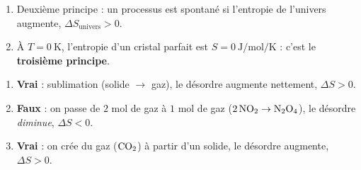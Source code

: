 \documentclass[11pt,a4paper]{article}
\newcommand{\dS}{\Delta S}
\newcommand{\rep}[1]{\textcolor{primarydark}{\textbf{#1}}}
\begin{document}
\begin{correction}
\begin{enumerate}[label=\alph*),leftmargin=2em,topsep=2pt,itemsep=2pt]
  \item Deuxième principe : un processus est spontané si l'entropie de l'univers augmente,
        \rep{$\dS_{\text{univers}}>0$}.
  \item À $T=\SI{0}{\kelvin}$, l'entropie d'un cristal parfait est \rep{$S=\SI{0}{\joule\per\mol\per\kelvin}$} :
        c'est le \rep{troisième principe}.
\end{enumerate}
\end{correction}

\begin{correction}
\begin{enumerate}[label=\alph*),leftmargin=2em,topsep=2pt,itemsep=2pt]
  \item \rep{Vrai} : sublimation (solide $\to$ gaz), le désordre augmente nettement, $\dS>0$.
  \item \rep{Faux} : on passe de $2$ mol de gaz à $1$ mol de gaz ($2\,\ce{NO2}\to\ce{N2O4}$), le désordre
        \emph{diminue}, $\dS<0$.
  \item \rep{Vrai} : on crée du gaz ($\ce{CO2}$) à partir d'un solide, le désordre augmente, $\dS>0$.
\end{enumerate}
\end{correction}
\end{document}
